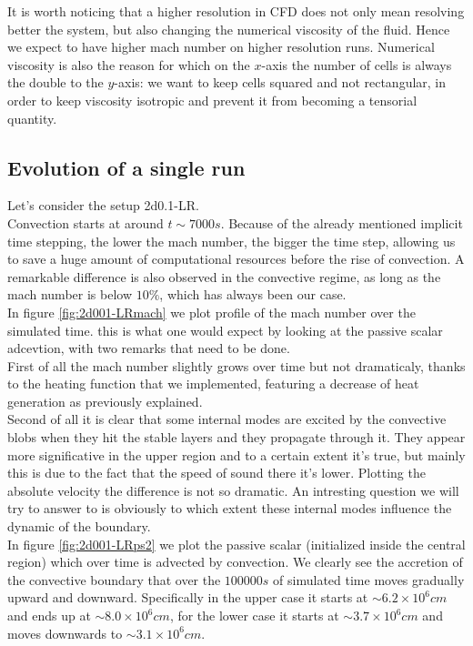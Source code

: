 It is worth noticing that a higher resolution in CFD does not only mean resolving better the system, but also changing the numerical viscosity of the fluid. Hence we expect to have higher mach number on higher resolution runs.
Numerical viscosity is also the reason for which on the $x$-axis the number of cells is always the double to the $y$-axis: we want to keep cells squared and not rectangular, in order to keep viscosity isotropic and prevent it from becoming a tensorial quantity. \\

\subsection{Evolution of a single run}
Let's consider the setup 2d0.1-LR. \\
Convection starts at around $t \sim 7000 s$. Because of the already mentioned implicit time stepping, the lower the mach number, the bigger the time step, allowing us to save a huge amount of computational resources before the rise of convection. A remarkable difference is also observed in the convective regime, as long as the mach number is below $10 \%$, which has always been our case. \\
In figure \ref{fig:2d001-LRmach} we plot profile of the mach number over the simulated time. this is what one would expect by looking at the passive scalar adcevtion, with two remarks that need to be done. \\
First of all the mach number slightly grows over time but not dramaticaly, thanks to the heating function that we implemented, featuring a decrease of heat generation as previously explained. \\
Second of all it is clear that some internal modes are excited by the convective blobs when they hit the stable layers and they propagate through it. They appear more significative in the upper region and to a certain extent it's true, but mainly this is due to the fact that the speed of sound there it's lower. Plotting the absolute velocity the difference is not so dramatic. An intresting question we will try to answer to is obviously to which extent these internal modes influence the dynamic of the boundary. \\
In figure \ref{fig:2d001-LRps2} we plot the passive scalar (initialized inside the central region) which over time is advected by convection. We clearly see the accretion of the convective boundary that over the $100000 s$ of simulated time moves gradually upward and downward. Specifically in the upper case it starts at $\sim 6.2 \times 10^{6} cm $ and ends up at $\sim 8.0 \times 10^{6} cm$, for the lower case it starts at $\sim 3.7 \times 10^{6} cm$ and moves downwards to $\sim 3.1 \times 10^{6} cm$. \\

